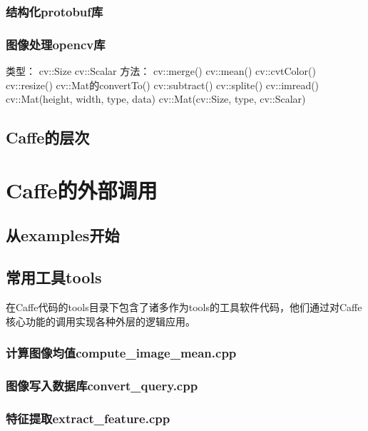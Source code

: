 \documentclass{../CNTeXBookTemplate/NanCNBook}
\begin{document}
\section{结构化protobuf库}

\section{图像处理opencv库}
类型：
cv::Size
cv::Scalar
方法：
cv::merge()
cv::mean()
cv::cvtColor()
cv::resize()
cv::Mat的convertTo()
cv::subtract()
cv::splite()
cv::imread()
cv::Mat(height, width, type, data)
cv::Mat(cv::Size, type, cv::Scalar)
\chapter{Caffe的层次}

\part{Caffe的外部调用}

\chapter{从examples开始} %


\chapter{常用工具tools}
在Caffe代码的tools目录下包含了诸多作为tools的工具软件代码，他们通过对Caffe核心功能的调用实现各种外层的逻辑应用。
\section{计算图像均值compute\_image\_mean.cpp}

\section{图像写入数据库convert\_query.cpp}


                    



\section{特征提取extract\_feature.cpp}
\end{document}
